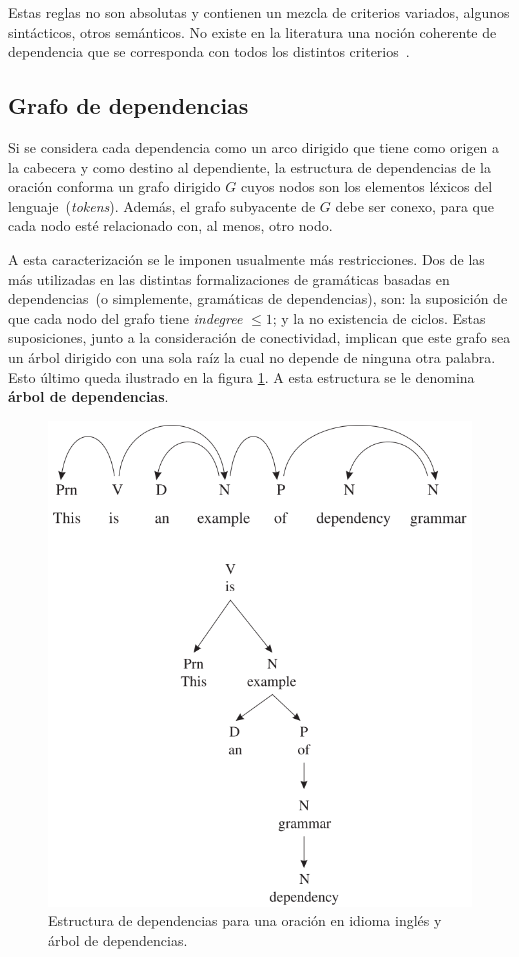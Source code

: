 Estas reglas no son absolutas y contienen un mezcla de criterios variados, algunos sintácticos, otros semánticos.
No existe en la literatura una noción coherente de dependencia que se corresponda con todos los distintos criterios~\cite{nivre2005dependency}.


\subsection{Grafo de dependencias}

Si se considera cada dependencia como un arco dirigido que tiene como origen a la cabecera y como destino al dependiente, la estructura de dependencias de la oración conforma un grafo dirigido $G$ cuyos nodos son los elementos léxicos del lenguaje~(\emph{tokens}).
Además, el grafo subyacente de $G$ debe ser conexo, para que cada nodo esté relacionado con, al menos, otro nodo.

A esta caracterización se le imponen usualmente más restricciones.
Dos de las más utilizadas en las distintas formalizaciones de gramáticas basadas en dependencias~(o simplemente, gramáticas de dependencias), son: la suposición de que cada nodo del grafo tiene \emph{indegree} $\leq 1$; y la no existencia de ciclos.
Estas suposiciones, junto a la consideración de conectividad, implican que este grafo sea un árbol dirigido con una sola raíz la cual no depende de ninguna otra palabra.
Esto último queda ilustrado en la figura \ref{fig:dep_tree}.
A esta estructura se le denomina \textbf{árbol de dependencias}.

\begin{figure}[h!]
	\centering
	\includegraphics[width=0.7\linewidth]{Graphics/dep_tree.png}
	\caption{Estructura de dependencias para una oración en idioma inglés y árbol de dependencias.}\label{fig:dep_tree}
\end{figure}

